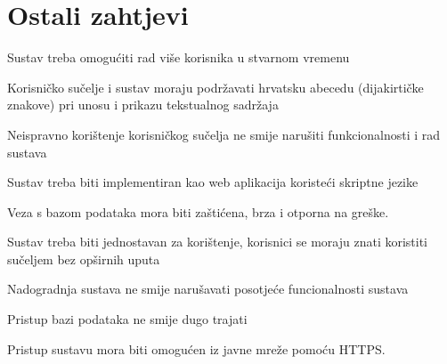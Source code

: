 		\section{Ostali zahtjevi}
		
%		 
%			 

		\begin{packed_item}
		
			\item Sustav treba omogućiti rad više korisnika u stvarnom vremenu
			\item 	Korisničko sučelje i sustav moraju podržavati hrvatsku abecedu (dijakirtičke znakove) pri unosu i prikazu tekstualnog sadržaja
			\item Neispravno korištenje korisničkog sučelja ne smije narušiti funkcionalnosti i rad sustava
			\item Sustav treba biti implementiran kao web aplikacija koristeći skriptne jezike
			\item Veza s bazom podataka mora biti zaštićena, brza i otporna na greške.
			\item Sustav treba biti jednostavan za korištenje, korisnici se moraju znati koristiti sučeljem bez opširnih uputa
			\item Nadogradnja sustava ne smije narušavati posotjeće funcionalnosti sustava
			\item Pristup bazi podataka ne smije dugo trajati
			\item Pristup sustavu mora biti omogućen iz javne mreže pomoću HTTPS.
		
		\end{packed_item}
			 
			 
	
